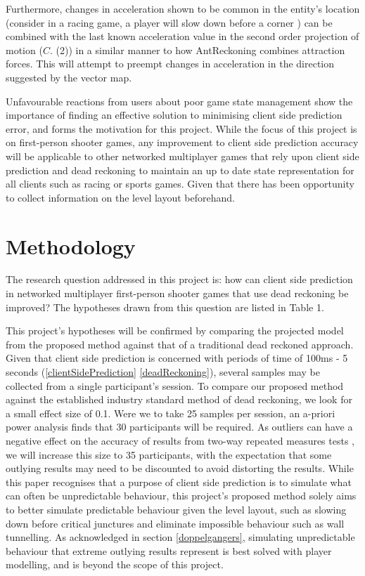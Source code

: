 \documentclass[journal]{IEEEtran}
\begin{document}
Furthermore, changes in acceleration shown to be common in the entity's location (consider in a racing game, a player will slow down before a corner \cite{larsson2016movement}) can be combined with the last known acceleration value in the second order projection of motion ($C.$ (2)) in a similar manner to how AntReckoning combines attraction forces. This will attempt to preempt changes in acceleration in the direction suggested by the vector map.

Unfavourable reactions from users about poor game state management show the importance of finding an effective solution to minimising client side prediction error, and forms the motivation for this project. While the focus of this project is on first-person shooter games, any improvement to client side prediction accuracy will be applicable to other networked multiplayer games that rely upon client side prediction and dead reckoning to maintain an up to date state representation for all clients such as racing or sports games. Given that there has been opportunity to collect information on the level layout beforehand.

\section{Methodology}

The research question addressed in this project is: how can client side prediction in networked multiplayer first-person shooter games that use dead reckoning be improved? The hypotheses drawn from this question are listed in Table 1.

This project's hypotheses will be confirmed by comparing the projected model from the proposed method against that of a traditional dead reckoned approach. Given that client side prediction is concerned with periods of time of 100ms - 5 seconds (\ref{clientSidePrediction} \ref{deadReckoning}), several samples may be collected from a single participant's session. To compare our proposed method against the established industry standard method of dead reckoning, we look for a small effect size of 0.1. Were we to take 25 samples per session, an a-priori power analysis finds that 30 participants will be required. As outliers can have a negative effect on the accuracy of results from two-way repeated measures tests \cite{anova2018laerd}, we will increase this size to 35 participants, with the expectation that some outlying results may need to be discounted to avoid distorting the results. While this paper recognises that a purpose of client side prediction is to simulate what can often be unpredictable behaviour, this project's proposed method solely aims to better simulate predictable behaviour given the level layout, such as slowing down before critical junctures and eliminate impossible behaviour such as wall tunnelling. As acknowledged in section \ref{doppelgangers}, simulating unpredictable behaviour that extreme outlying results represent is best solved with player modelling, and is beyond the scope of this project.
\end{document}
